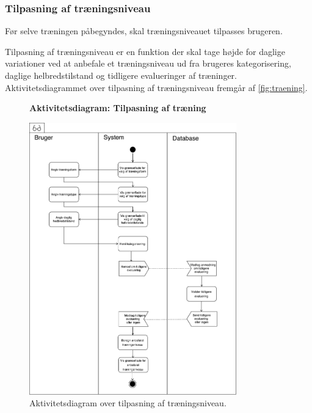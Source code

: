 \subsubsection*{Tilpasning af træningsniveau} \label{sec:traeningsniveau}
Før selve træningen påbegyndes, skal træningsniveauet tilpasses brugeren. 

Tilpasning af træningsniveau er en funktion der skal tage højde for daglige variationer ved at anbefale et træningsniveau ud fra brugeres kategorisering, daglige helbredstilstand og tidligere evalueringer af træninger.  
Aktivitetsdiagrammet over tilpasning af træningsniveau fremgår af \autoref{fig:traening}.

\begin{figure} [H]
\centering
\textbf{Aktivitetsdiagram: Tilpasning af træning}\par\medskip
\includegraphics[width=0.8\textwidth]{figures/aktivitetsdiagram/Tilpasningaftraeningsniveau}
\caption{Aktivitetsdiagram over tilpasning af træningsniveau.}
\label{fig:traeningsniveau}
\end{figure}

